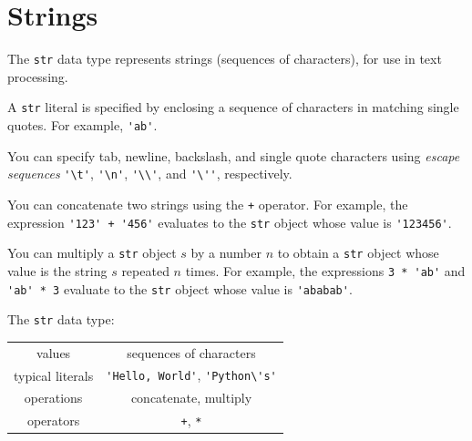 \documentclass[8pt,a4paper,compress,handout]{beamer}
\begin{document}
\section{Strings}
\begin{frame}[fragile]
The \lstinline{str} data type represents strings (sequences of characters), for use in text processing.

\bigskip

A \lstinline{str} literal is specified by enclosing a sequence of characters in matching single quotes. For example, \lstinline{'ab'}.

\bigskip

You can specify tab, newline, backslash, and single quote characters using \emph{escape sequences} \lstinline{'\t'}, \lstinline{'\n'}, \lstinline{'\\'}, and \lstinline{'\''}, respectively.

\bigskip

You can concatenate two strings using the \lstinline{+} operator. For example, the expression \lstinline{'123' + '456'} evaluates to the \lstinline{str} object whose value is \lstinline{'123456'}.

\bigskip

You can multiply a \lstinline{str} object $s$ by a number $n$ to obtain a \lstinline{str} object whose value is the string $s$ repeated $n$ times. For example, the expressions \lstinline{3 * 'ab'} and \lstinline{'ab' * 3} evaluate to the \lstinline{str} object whose value is \lstinline{'ababab'}.

\bigskip

The \lstinline{str} data type:

\begin{center}
\begin{tabular}{c|c}
values & sequences of characters \\ 
typical literals & \lstinline$'Hello, World'$, \lstinline$'Python\'s'$ \\ 
operations & concatenate, multiply \\
operators & \lstinline$+$, \lstinline$*$
\end{tabular} 
\end{center}
\end{frame}
\end{document}
